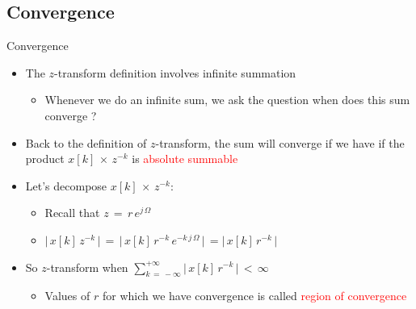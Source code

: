 \documentclass{beamer}
\begin{document}
\subsection{Convergence}
\begin{frame}[t,allowframebreaks]{Convergence}

\begin{itemize}

\item The $z$-transform definition involves infinite summation

	\begin{itemize}
	\item Whenever we do an infinite sum, we ask the question  when does this sum converge ?
	\end{itemize}

\item Back to the definition of $z$-transform, the sum will converge if we have if the product $x[k] \, \times \, z^{-k}$ is \textcolor{red}{absolute summable}

\item Let's decompose $x[k] \, \times \, z^{-k}$:

	\begin{itemize}
	\item Recall that $z \, = \, r \, e^{j \, \Omega}$
	
	\item $\lvert \,x[k] \,z^{-k}  \,\rvert \, = \, \lvert \,x[k] \,r^{-k} \, e^{-k \, j \, \Omega}  \,\rvert \, = \lvert \,x[k] \,r^{-k} \,\rvert$
	\end{itemize}

\item So $z$-transform when $\displaystyle\sum_{k \, = \, - \infty}^{+ \infty} \lvert \,x[k] \,r^{-k} \,\rvert \, < \, \infty$

	\begin{itemize}
	\item Values of $r$ for which we have convergence is called \textcolor{red}{region of convergence}
	\end{itemize}

\end{itemize}


\end{frame}
\end{document}
